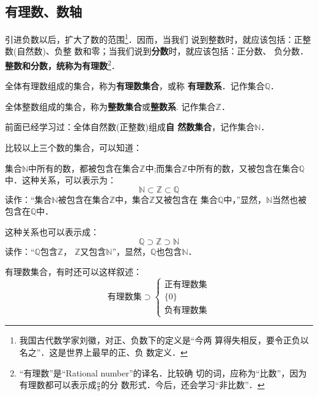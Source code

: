 \subsection{有理数、数轴}
    引进负数以后，扩大了数的范围\footnote{我国古代数学家刘徽，对正、负数下的定义是“今两
算得失相反，要令正负以名之”．这是世界上最早的正、负
数定义．}．因而，当我们
说到整数时，就应该包括：正整数(自然数)、负整
数和零；当我们说到\textbf{分数}时，就应该包括：正分数、
负分数． \textbf{整数和分数，统称为有理数}\footnote{“有理数”是``Rational number''的译名．比较确
切的词，应称为“比数”，因为有理数都可以表示成$\frac{a}{b}$的分
数形式．今后，还会学习“非比数”．}．

全体有理数组成的集合，称为\textbf{有理数集合}，或称
\textbf{有理数系}．记作集合$\mathbb{Q}$．

    全体整数组成的集合，称为\textbf{整数集合}或\textbf{整数系}.
记作集合$\mathbb{Z}$．
\begin{center}
    \end{center}

    前面已经学习过：全体自然数(正整数)组成\textbf{自
然数集合}，记作集合$\mathbb{N}$．

    比较以上三个数的集合，可以知道：

集合$\mathbb{N}$中所有的数，都被包含在集合$\mathbb{Z}$中;而集合$\mathbb{Z}$中所有的数，又被包含在集合$\mathbb{Q}$中．这种关系，可以表示为：
\[\mathbb{N}\subset \mathbb{Z} \subset \mathbb{Q}\]       
读作：“集合$\mathbb{N}$被包含在集合$\mathbb{Z}$中，集合$\mathbb{Z}$又被包含在
集合$\mathbb{Q}$中，”显然，$\mathbb{N}$当然也被包含在$\mathbb{Q}$中．

这种关系也可以表示成：
\[\mathbb{Q}\supset \mathbb{Z} \supset \mathbb{N}\]       
读作：“$\mathbb{Q}$包含$\mathbb{Z}$，
    $\mathbb{Z}$又包含$\mathbb{N}$”，显然，$\mathbb{Q}$也包含$\mathbb{N}$．

    有理数集合，有时还可以这样叙述：
\[\text{有理数集}\supset \begin{cases}
    \text{正有理数集}\\
    \{0\}\\
    \text{负有理数集}
\end{cases} \]
    
